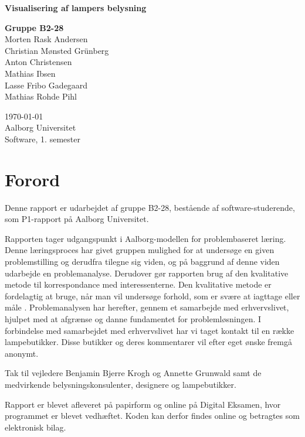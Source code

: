 \begin{titlepage}
  \vspace{0.2cm}
  \begin{center}
    \Huge{\textbf{Visualisering af lampers belysning}}
  \end{center}
  \vspace{0.2cm}
  \begin{center}
    \Large{\textbf{Gruppe B2-28}}\\
	Morten Rask Andersen\\
	Christian Mønsted Grünberg\\
	Anton Christensen\\
	Mathias Ibsen\\
	Lasse Fribo Gadegaard\\
	Mathias Rohde Pihl
  \end{center}
  \vfill
  \begin{center}
 	\today\\
    Aalborg Universitet\\
    Software, 1. semester
  \end{center}
\end{titlepage}


\addtocounter{page}{-1}
\clearpage



\clearpage


\section{Forord}
Denne rapport er udarbejdet af gruppe B2-28, bestående af software-studerende, som P1-rapport på Aalborg Universitet.

Rapporten tager udgangspunkt i Aalborg-modellen for problembaseret læring. Denne læringsproces har givet gruppen mulighed for at undersøge en given problemstilling og derudfra tilegne sig viden, og på baggrund af denne viden udarbejde en problemanalyse. Derudover gør rapporten brug af den kvalitative metode til korrespondance med interessenterne. Den kvalitative metode er fordelagtig at bruge, når man vil undersøge forhold, som er svære at iagttage eller måle \cite{kvalitativ_metode}. Problemanalysen har herefter, gennem et samarbejde med erhvervslivet, hjulpet med at afgrænse og danne fundamentet for problemløsningen. I forbindelse med samarbejdet med erhvervslivet har vi taget kontakt til en række lampebutikker. Disse butikker og deres kommentarer vil efter eget ønske fremgå anonymt. 

Tak til vejledere Benjamin Bjerre Krogh og Annette Grunwald samt de medvirkende belysningskonsulenter, designere og lampebutikker.

Rapport er blevet afleveret på papirform og online på Digital Eksamen, hvor programmet er blevet vedhæftet. Koden kan derfor findes online og betragtes som elektronisk bilag. 
\clearpage

\clearpage